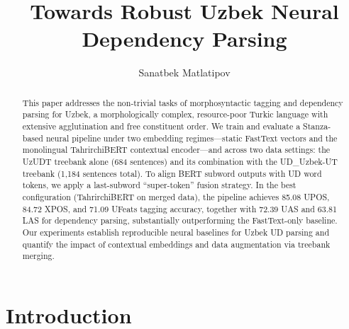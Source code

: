\documentclass[runningheads]{llncs}
\begin{document}
%
\title{Towards Robust Uzbek Neural Dependency Parsing}
%
%
\author{Sanatbek Matlatipov}
%
%
%
\maketitle              %
%
\begin{abstract}
This paper addresses the non-trivial tasks of morphosyntactic tagging and dependency parsing for Uzbek, a morphologically complex, resource-poor Turkic language with extensive agglutination and free constituent order. We train and evaluate a Stanza-based neural pipeline under two embedding regimes---static FastText vectors and the monolingual TahrirchiBERT contextual encoder---and across two data settings: the UzUDT treebank alone (684 sentences) and its combination with the UD\_Uzbek-UT treebank (1{,}184 sentences total). To align BERT subword outputs with UD word tokens, we apply a last-subword ``super-token'' fusion strategy. In the best configuration (TahrirchiBERT on merged data), the pipeline achieves 85.08 UPOS, 84.72 XPOS, and 71.09 UFeats tagging accuracy, together with 72.39 UAS and 63.81 LAS for dependency parsing, substantially outperforming the FastText-only baseline. Our experiments establish reproducible neural baselines for Uzbek UD parsing and quantify the impact of contextual embeddings and data augmentation via treebank merging.
\end{abstract}

%
%
%
\section{Introduction}
\end{document}
